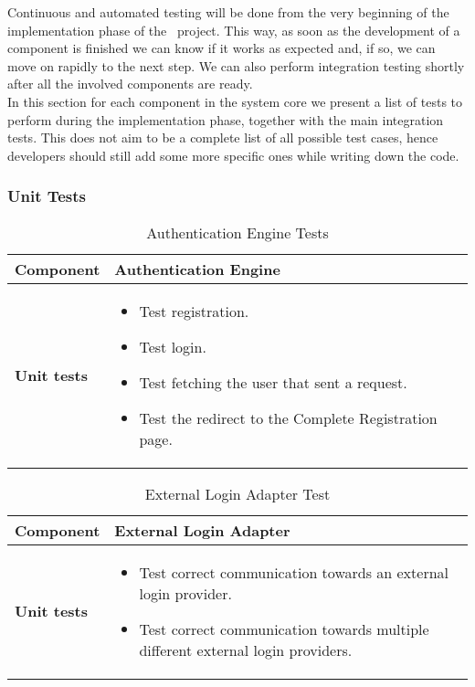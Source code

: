 Continuous and automated testing will be done from the very beginning of the implementation phase of the \projectname~project. This way, as soon as the development of a component is finished we can know if it works as expected and, if so, we can move on rapidly to the next step. We can also perform integration testing shortly after all the involved components are ready. \\
In this section for each component in the system core we present a list of tests to perform during the implementation phase, together with the main integration tests. This does not aim to be a complete list of all possible test cases, hence developers should still add some more specific ones while writing down the code. \\

\subsubsection{Unit Tests}

\begin{table}[H]	
	\centering
	\def\arraystretch{1.5}
	\begin{tabular}{|m{4cm}|m{12cm}|}
		\hline
		\textbf{Component} & Authentication Engine \\ \hline
		\textbf{Unit tests} & 
			\begin{itemize}
			\item Test registration.
			\item Test login.
			\item Test fetching the user that sent a request.
			\item Test the redirect to the Complete Registration page.
			\end{itemize} \\ \hline
	\end{tabular}
	\caption{Authentication Engine Tests}
\end{table}

\begin{table}[H]	
	\centering
	\def\arraystretch{1.5}
	\begin{tabular}{|m{4cm}|m{12cm}|}
		\hline
		\textbf{Component} & External Login Adapter \\ \hline
		\textbf{Unit tests} & 
			\begin{itemize}
			\item Test correct communication towards an external login provider.
			\item Test correct communication towards multiple different external login providers.
			\end{itemize} \\ \hline
	\end{tabular}
	\caption{External Login Adapter Test}
\end{table}

